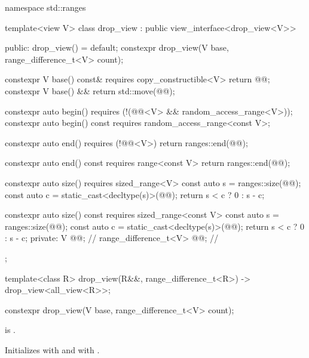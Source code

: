 %
%
%
%
\begin{codeblock}
namespace std::ranges {
  template<view V>
  class drop_view : public view_interface<drop_view<V>> {
  public:
    drop_view() = default;
    constexpr drop_view(V base, range_difference_t<V> count);

    constexpr V base() const& requires copy_constructible<V> { return @@; }
    constexpr V base() && { return std::move(@@); }

    constexpr auto begin()
      requires (!(@@<V> && random_access_range<V>));
    constexpr auto begin() const
      requires random_access_range<const V>;

    constexpr auto end()
      requires (!@@<V>)
    { return ranges::end(@@); }

    constexpr auto end() const
      requires range<const V>
    { return ranges::end(@@); }

    constexpr auto size()
      requires sized_range<V>
    {
      const auto s = ranges::size(@@);
      const auto c = static_cast<decltype(s)>(@@);
      return s < c ? 0 : s - c;
    }

    constexpr auto size() const
      requires sized_range<const V>
    {
      const auto s = ranges::size(@@);
      const auto c = static_cast<decltype(s)>(@@);
      return s < c ? 0 : s - c;
    }
  private:
    V @@;                                    // \expos
    range_difference_t<V> @@;               // \expos
  };

  template<class R>
    drop_view(R&&, range_difference_t<R>) -> drop_view<all_view<R>>;
}
\end{codeblock}

%
\begin{itemdecl}
constexpr drop_view(V base, range_difference_t<V> count);
\end{itemdecl}

\begin{itemdescr}
\pnum
\expects
{} is .

\pnum
\effects
Initializes  with  and
 with .
\end{itemdescr}

